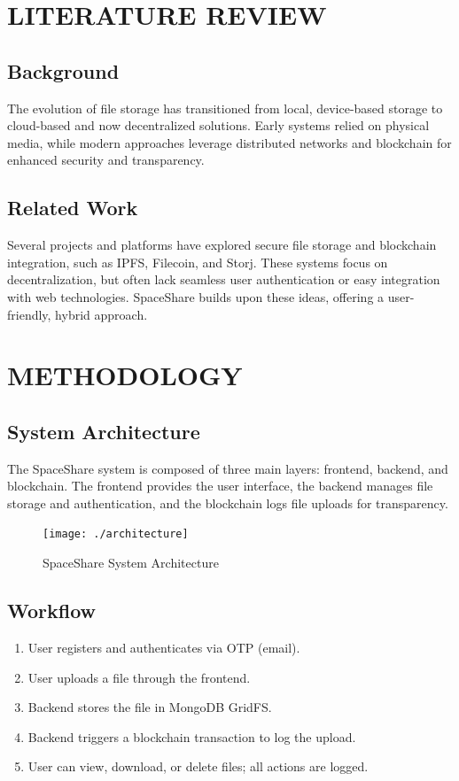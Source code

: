 \documentclass[a4paper, 12pt]{report}
\newenvironment{frontmatter}{}{}
\begin{document}
\begin{frontmatter}

\chapter{LITERATURE REVIEW}
\section{Background}
The evolution of file storage has transitioned from local, device-based storage to cloud-based and now decentralized solutions. Early systems relied on physical media, while modern approaches leverage distributed networks and blockchain for enhanced security and transparency.

\section{Related Work}
Several projects and platforms have explored secure file storage and blockchain integration, such as IPFS, Filecoin, and Storj. These systems focus on decentralization, but often lack seamless user authentication or easy integration with web technologies. SpaceShare builds upon these ideas, offering a user-friendly, hybrid approach.

\chapter{METHODOLOGY}
\section{System Architecture}
The SpaceShare system is composed of three main layers: frontend, backend, and blockchain. The frontend provides the user interface, the backend manages file storage and authentication, and the blockchain logs file uploads for transparency.

\begin{figure}[H]
    \centering
    \texttt{[image: ./architecture]}
    \caption{SpaceShare System Architecture}
\end{figure}

\section{Workflow}
\begin{enumerate}
    \item User registers and authenticates via OTP (email).
    \item User uploads a file through the frontend.
    \item Backend stores the file in MongoDB GridFS.
    \item Backend triggers a blockchain transaction to log the upload.
    \item User can view, download, or delete files; all actions are logged.
\end{enumerate}


\end{frontmatter}
\end{document}
